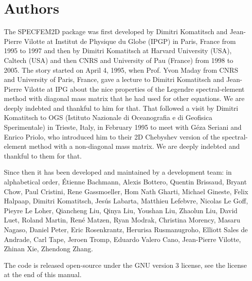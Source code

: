 \section*{Authors}

The SPECFEM2D package was first developed by Dimitri
Komatitsch and Jean-Pierre Vilotte at Institut de Physique du Globe
(IPGP) in Paris, France from 1995 to 1997 and then by Dimitri Komatitsch
at Harvard University (USA), Caltech (USA) and then CNRS and University of Pau (France) from 1998 to 2005.
The story started on April 4, 1995, when Prof. Yvon Maday from CNRS and University of Paris, France, gave a lecture to
Dimitri Komatitsch and Jean-Pierre Vilotte at IPG about the nice properties of the Legendre spectral-element method with diagonal mass matrix that he had used for
other equations. We are deeply indebted and thankful to him for that.
That followed a visit by Dimitri Komatitsch to OGS (Istituto Nazionale di Oceanografia e di Geofisica Sperimentale) in Trieste, Italy, in February 1995
to meet with G\'eza Seriani and Enrico Priolo, who introduced him to their 2D Chebyshev version of the spectral-element method with a non-diagonal mass matrix.
We are deeply indebted and thankful to them for that.\newline

Since then it has been developed and maintained by a development team: in alphabetical order,
\'Etienne Bachmann,
Alexis Bottero,
Quentin Brissaud,
Bryant Chow,
Paul Cristini,
Rene Gassmoeller,
Hom Nath Gharti,
Michael Gineste,
Felix Halpaap,
Dimitri Komatitsch,
Jes\'us Labarta,
Matthieu Lefebvre,
Nicolas Le Goff,
Pieyre Le Loher,
Qiancheng Liu,
Qinya Liu,
Youshan Liu,
Zhaolun Liu,
David Luet,
Roland Martin,
Ren\'e Matzen,
Ryan Modrak,
Christina Morency,
Masaru Nagaso,
Daniel Peter,
Eric Rosenkrantz,
Herurisa Rusmanugroho,
Elliott Sales de Andrade,
Carl Tape,
Jeroen Tromp,
Eduardo Valero Cano,
Jean-Pierre Vilotte,
Zhinan Xie,
Zhendong Zhang.\newline

The code is released open-source under the GNU version 3 license, see the license at the end of this manual.

